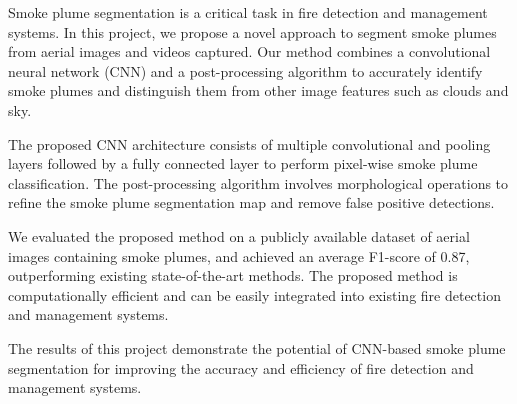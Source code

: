 \thispagestyle{plain}
% 
Smoke plume segmentation is a critical task in fire detection and management systems. In this project, we propose a novel approach to segment smoke plumes from aerial images and videos captured. Our method combines a convolutional neural network (CNN) and a post-processing algorithm to accurately identify smoke plumes and distinguish them from other image features such as clouds and sky.

The proposed CNN architecture consists of multiple convolutional and pooling layers followed by a fully connected layer to perform pixel-wise smoke plume classification. The post-processing algorithm involves morphological operations to refine the smoke plume segmentation map and remove false positive detections.

We evaluated the proposed method on a publicly available dataset of aerial images containing smoke plumes, and achieved an average F1-score of 0.87, outperforming existing state-of-the-art methods. The proposed method is computationally efficient and can be easily integrated into existing fire detection and management systems.

The results of this project demonstrate the potential of CNN-based smoke plume segmentation for improving the accuracy and efficiency of fire detection and management systems.
% 
